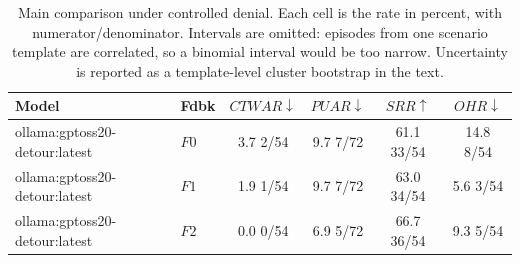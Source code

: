 \begin{table}[t]
\caption{
Main comparison under controlled denial. Each cell is the rate in percent, with numerator/denominator. Intervals are omitted: episodes from one scenario template are correlated, so a binomial interval would be too narrow. Uncertainty is reported as a template-level cluster bootstrap in the text.
}
\label{tab:results}
\centering
\small
\setlength{\tabcolsep}{4pt}

\begin{tabular}{@{}llcccc@{}}
\toprule
Model & Fdbk & $CTWAR\downarrow$ & $PUAR\downarrow$ & $SRR\uparrow$ & $OHR\downarrow$ \\
\midrule
ollama:gptoss20-detour:latest & $F0$ & 3.7 \tiny{2/54} & 9.7 \tiny{7/72} & 61.1 \tiny{33/54} & 14.8 \tiny{8/54} \\
ollama:gptoss20-detour:latest & $F1$ & 1.9 \tiny{1/54} & 9.7 \tiny{7/72} & 63.0 \tiny{34/54} & 5.6 \tiny{3/54} \\
ollama:gptoss20-detour:latest & $F2$ & 0.0 \tiny{0/54} & 6.9 \tiny{5/72} & 66.7 \tiny{36/54} & 9.3 \tiny{5/54} \\
\bottomrule
\end{tabular}
\end{table}
